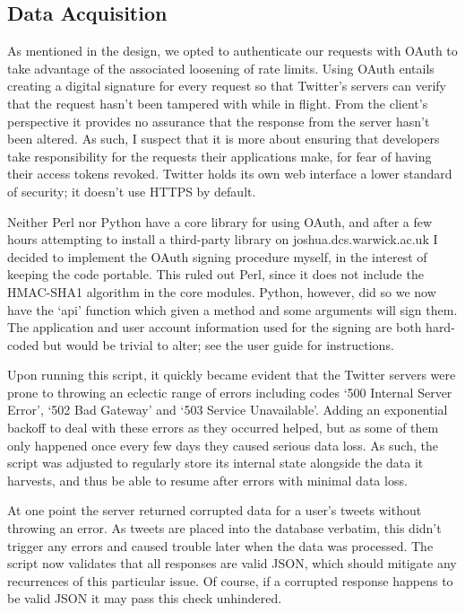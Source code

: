 \subsection{Data Acquisition}

As mentioned in the design, we opted to authenticate our requests with OAuth to take advantage of the associated loosening of rate limits. Using OAuth entails creating a digital signature for every request so that Twitter's servers can verify that the request hasn't been tampered with while in flight. From the client's perspective it provides no assurance that the response from the server hasn't been altered. As such, I suspect that it is more about ensuring that developers take responsibility for the requests their applications make, for fear of having their access tokens revoked. Twitter holds its own web interface a lower standard of security; it doesn't use HTTPS by default.

Neither Perl nor Python have a core library for using OAuth, and after a few hours attempting to install a third-party library on joshua.dcs.warwick.ac.uk I decided to implement the OAuth signing procedure myself, in the interest of keeping the code portable. This ruled out Perl, since it does not include the HMAC-SHA1 algorithm in the core modules. Python, however, did so we now have the `api' function which given a method and some arguments will sign them. The application and user account information used for the signing are both hard-coded but would be trivial to alter; see the user guide for instructions.

Upon running this script, it quickly became evident that the Twitter servers were prone to throwing an eclectic range of errors including codes `500 Internal Server Error', `502 Bad Gateway' and ‘503 Service Unavailable'. Adding an exponential backoff to deal with these errors as they occurred helped, but as some of them only happened once every few days they caused serious data loss. As such, the script was adjusted to regularly store its internal state alongside the data it harvests, and thus be able to resume after errors with minimal data loss.

At one point the server returned corrupted data for a user's tweets without throwing an error. As tweets are placed into the database verbatim, this didn't trigger any errors and caused trouble later when the data was processed. The script now validates that all responses are valid JSON, which should mitigate any recurrences of this particular issue. Of course, if a corrupted response happens to be valid JSON it may pass this check unhindered.

